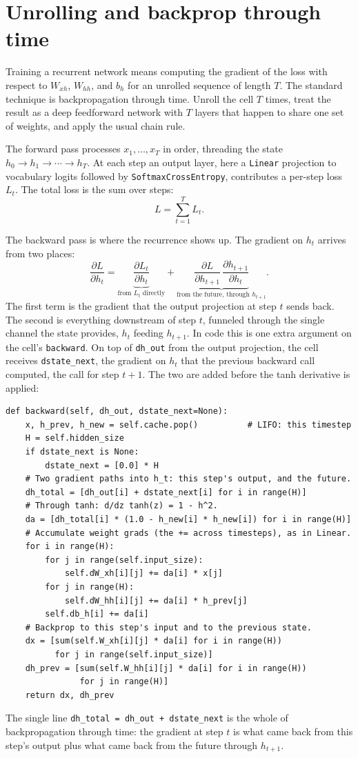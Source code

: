 \section{Unrolling and backprop through time}\label{sec:bptt}

Training a recurrent network means computing the gradient of the loss with
respect to $W_{xh}$, $W_{hh}$, and $b_h$ for an unrolled sequence of length
$T$. The standard technique is backpropagation through time. Unroll the cell
$T$ times, treat the result as a deep feedforward network with $T$ layers
that happen to share one set of weights, and apply the usual chain rule.

The forward pass processes $x_1, \ldots, x_T$ in order, threading the state
$h_0 \to h_1 \to \cdots \to h_T$. At each step an output layer, here a
\texttt{Linear} projection to vocabulary logits followed by
\texttt{SoftmaxCrossEntropy}, contributes a per-step loss $L_t$. The total
loss is the sum over steps:
\[
  L = \sum_{t=1}^{T} L_t.
\]

The backward pass is where the recurrence shows up. The gradient on $h_t$
arrives from two places:
\[
  \frac{\partial L}{\partial h_t}
  =
  \underbrace{\frac{\partial L_t}{\partial h_t}}_{\text{from $L_t$ directly}}
  +
  \underbrace{\frac{\partial L}{\partial h_{t+1}}\,
              \frac{\partial h_{t+1}}{\partial h_t}}_{\text{from the future,
              through $h_{t+1}$}}.
\]
The first term is the gradient that the output projection at step $t$ sends
back. The second is everything downstream of step $t$, funneled through the
single channel the state provides, $h_t$ feeding $h_{t+1}$. In code this is
one extra argument on the cell's \texttt{backward}. On top of
\texttt{dh\_out} from the output projection, the cell receives
\texttt{dstate\_next}, the gradient on $h_t$ that the previous backward call
computed, the call for step $t+1$. The two are added before the tanh
derivative is applied:
\begin{lstlisting}
def backward(self, dh_out, dstate_next=None):
    x, h_prev, h_new = self.cache.pop()          # LIFO: this timestep
    H = self.hidden_size
    if dstate_next is None:
        dstate_next = [0.0] * H
    # Two gradient paths into h_t: this step's output, and the future.
    dh_total = [dh_out[i] + dstate_next[i] for i in range(H)]
    # Through tanh: d/dz tanh(z) = 1 - h^2.
    da = [dh_total[i] * (1.0 - h_new[i] * h_new[i]) for i in range(H)]
    # Accumulate weight grads (the += across timesteps), as in Linear.
    for i in range(H):
        for j in range(self.input_size):
            self.dW_xh[i][j] += da[i] * x[j]
        for j in range(H):
            self.dW_hh[i][j] += da[i] * h_prev[j]
        self.db_h[i] += da[i]
    # Backprop to this step's input and to the previous state.
    dx = [sum(self.W_xh[i][j] * da[i] for i in range(H))
          for j in range(self.input_size)]
    dh_prev = [sum(self.W_hh[i][j] * da[i] for i in range(H))
               for j in range(H)]
    return dx, dh_prev
\end{lstlisting}
The single line \texttt{dh\_total = dh\_out + dstate\_next} is the whole of
backpropagation through time: the gradient at step $t$ is what came back from
this step's output plus what came back from the future through $h_{t+1}$.

